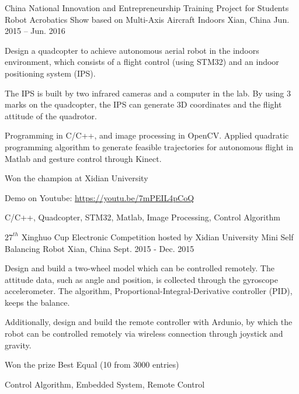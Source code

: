 \begin{cventries}
  \cventry
    {China National Innovation and Entrepreneurship Training Project for Students} 
    {Robot Acrobatics Show based on Multi-Axis Aircraft Indoors}
    {Xian, China} %
    {Jun. 2015 – Jun. 2016} %
    {
      \begin{cvitems} %
        \item {Design a quadcopter to achieve autonomous aerial robot in the indoors environment, which consists of a flight control (using STM32) and an indoor positioning system (IPS). }
        \item {The IPS is built by two infrared cameras and a computer in the lab. By using 3 marks on the quadcopter, the IPS can generate 3D coordinates and the flight attitude of the quadrotor. }
        \item {Programming in C/C++, and image processing in OpenCV. Applied quadratic programming algorithm to generate feasible trajectories for autonomous flight in Matlab and gesture control through Kinect.}
        \item {Won the champion at Xidian University}
        \item {Demo on Youtube:  \url{https://youtu.be/7mPEIL4pCoQ}}
      \end{cvitems}
    }
	{C/C++,  Quadcopter, STM32, Matlab, Image Processing, Control Algorithm }	

  \cventry
    {$27^{th}$ Xinghuo Cup Electronic Competition hosted by Xidian University} %
    {Mini Self Balancing Robot} %
    {Xian, China} %
    {Sept. 2015 - Dec. 2015} %
    {
      \begin{cvitems} %
        \item {Design and build a two-wheel model which can be controlled remotely. The attitude data, such as angle and position, is collected through the gyroscope accelerometer. The algorithm, Proportional-Integral-Derivative controller (PID), keeps the balance.}
       \item {Additionally, design and build the remote controller with Ardunio, by which the robot can be controlled remotely via wireless connection
       	through joystick and gravity.}
       \item {Won the prize Best Equal (10 from 3000 entries)}
      \end{cvitems}
    }{Control Algorithm,  Embedded System, Remote Control}

\end{cventries}

